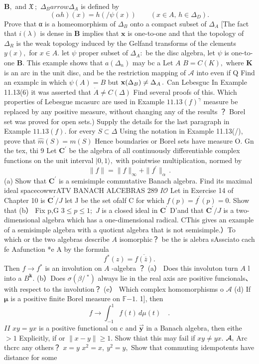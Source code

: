 ${\boldsymbol{B}},$ and ${\mathfrak{X}}\,;$ $\Delta_{B} arrow\Delta_{A}$ is defined by $$ (\alpha h)(x)=h(\slash{\psi}(x))\qquad(x\in A,\,h\in\Delta_{D}). $$ Prove that α is a homeomorphism of $\Delta_{B}$ onto a compact subset of $\textstyle\Delta_{A}$ [The fact that $\scriptstyle{i(\lambda)}$ is dense in $\boldsymbol{B}$ implies that $\scriptstyle{\mathcal{\mathbf{x}}}$ is one-to-one and that the topology of $\Delta_{R}$ is the weak topology induced by the Gelfand transforms of the clements $\scriptstyle y(x),$ for $x\in A.$ let $\psi$ proper subset of $\textstyle\Delta_{A}:$ be the disc algebra, let $\psi$ is one-to-one ${\boldsymbol{B}}.$ This example shows that $\scriptstyle a(\Delta_{n})$ may bc a Let $\scriptstyle A$ $B=C(K),$ where $\boldsymbol{K}$ is an arc in the unit disc, and be the restriction mapping of ${\mathcal{A}}$ into even if Q Find an examplc in which $\psi(A)=B$ but ${\bf x}(\Delta_{B})\neq\Delta_{A}\,.$ Can Lebesguc In Example 11.13(6) it was asserted that ${\dot{A}}\neq C(\Delta)$ Find several proofs of this. Which properties of Lebesgue mcasurc are used in Example $11.13(f)^{\gamma}$ measure be replaced by any positive measure, without changing any of the results ？ Borel set was proved for open sets.) Supply the details for the last paragraph in Example $11.13(f).$ for every $S\subset\Delta$ Using the notation in Example 11.13(/), prove that ${\hat{m}}(S)=m(S)$ Hence boundaries or Borel sets have measure O. Gn the tex, thi 9 Let ${\boldsymbol{C}}^{\prime}$ be the algebra of all continuously differentiable complex functions on the unit interval $|0,1\rangle,$ with pointwise multiplication, normed by $$ \|f\|=\|f\|_{\infty}+\|f^{\prime}\|_{\alpha}\,. $$ (a) Show that ${\boldsymbol{C}}^{\prime}$ is a semisimple commutative Banach algebra. Find its maximal ideal spacecowwrATV BANACH ALCEBRAS 289 $I{\mathcal{O}}$ Let in Exercise 14 of Chapter 10 is ${\boldsymbol{C}}^{\prime}/J$ let J be the set ofalf C for which $f(p)=f^{\prime}(p)=0.$ Show that (b） Fix p,G $3\leq p\leq1;$ ${\mathbf{}}J$ is a closed ideal in ${\boldsymbol{C}}^{\prime}$ D’and that ${\boldsymbol{C}}^{\prime}/J$ is a two-dimensional algebra which has a one-dimensional radical. CThis gives an example of a semisimple algebra with a quoticnt algebra that is not semisimple.）To which or the two algebras describe $\textstyle A$ isomorphic？ be the is alebra sAssciato cach fe Aafunction *e A by the formula $$ f^{*}(z)={\overline{{f({\overline{{z}}})}}}. $$ Then $f\to f^{*}$ is an involution on $\textstyle A$ -algebra ？ (a） Does this involuton turn $\scriptstyle{A}$ l into a $B^{\mathbf{k}}.$ (b）Does $\sigma(\beta/\ ^{*})$ always lie in the real axis are positive funcionals、with respect to ths involution？ (e） Which complex homomorphisms o $\scriptstyle{\mathcal{A}}$ (d) If ${\boldsymbol{\mu}}$ is a positive finite Borel measure on $\mathbb{F}{\boldsymbol{-}}1.$ 1], then $$ f\to\int_{-1}^{1}f(t)\,d\mu(t)\quad. $$ $I I$ $x y=y x$ is a positive functional on c and $\mathbf{\vec{y}}$ in a Banach algebra, then eithe $\scriptstyle>1$ Explicitly, if or $\|x-y\|\geq1.$ Show thiat this may fail if $x y\neq y x.$ ${\cal A},$ Arc thcrc any others？ $x=y$ $x^{2}=x,\ y^{2}=y,$ Show that commuting idempotents have distance for some 